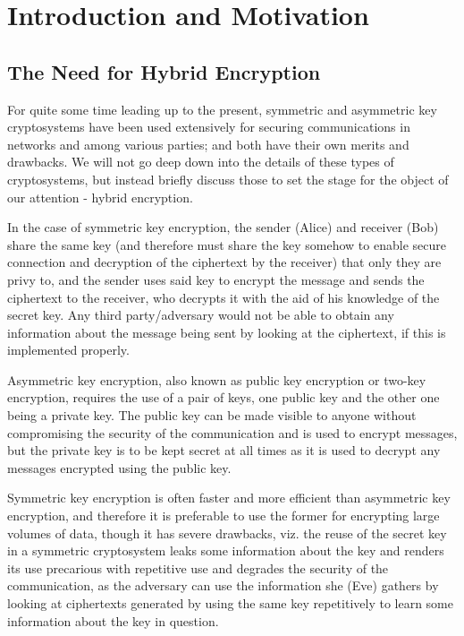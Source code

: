 \section{Introduction and Motivation}
\subsection{The Need for Hybrid Encryption}
For quite some time leading up to the present, symmetric and asymmetric key cryptosystems have been used extensively for securing communications in networks and among various parties; and both have their own merits and drawbacks. We will not go deep down into the details of these types of cryptosystems, but instead briefly discuss those to set the stage for the object of our attention - hybrid encryption.

In the case of symmetric key encryption, the sender (Alice) and receiver (Bob) share the same key (and therefore must share the key somehow to enable secure connection and decryption of the ciphertext by the receiver) that only they are privy to, and the sender uses said key to encrypt the message and sends the ciphertext to the receiver, who decrypts it with the aid of his knowledge of the secret key. Any third party/adversary would not be able to obtain any information about the message being sent by looking at the ciphertext, if this is implemented properly.\cite{smirnoff_turner_2019}

Asymmetric key encryption, also known as public key encryption or two-key encryption\cite{kaliski_acry}, requires the use of a pair of keys, one public key and the other one being a private key. The public key can be made visible to anyone without compromising the security of the communication and is used to encrypt messages, but the private key is to be kept secret at all times as it is used to decrypt any messages encrypted using the public key.\cite{savvyasym}

Symmetric key encryption is often faster and more efficient than asymmetric key encryption, and therefore it is preferable to use the former for encrypting large volumes of data, though it has severe drawbacks, viz. the reuse of the secret key in a symmetric cryptosystem leaks some information about the key and renders its use precarious with repetitive use and degrades the security of the communication, as the adversary can use the information she (Eve) gathers by looking at ciphertexts generated by using the same key repetitively to learn some information about the key in question.\cite{smirnoff_turner_2019}

